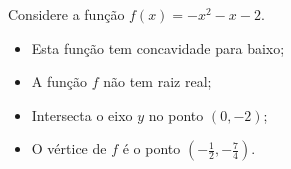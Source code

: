 \begin{exem}
 Considere a função $f(x)= -x^2-x-2$.

 \begin{itemize}
    \item Esta função tem concavidade para baixo;
    \item A função $f$ não tem raiz real;
    \item Intersecta o eixo $y$ no ponto $(0,-2)$;
    \item O vértice de $f$ é o ponto $(-\frac{1}{2}, -\frac{7}{4})$.
\end{itemize}

\begin{center}
\end{center}

\end{exem}

